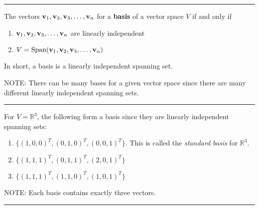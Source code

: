   

\rule[0.01in]{\textwidth}{0.0025in}


\begin{tcolorbox}[colback=yellow!10!,colframe=gray!15!]

\begin{definition}
	The vectors ${\bf v}_1, {\bf v}_2, {\bf v}_3, \dots , {\bf v}_n$ for a \textbf{basis} of a vector space $V$ if and only if
	\begin{enumerate}
		\item ${\bf v}_1, {\bf v}_2, {\bf v}_3, \dots , {\bf v}_n$  are linearly independent
		\item $V = \text{Span}({\bf v}_1, {\bf v}_2, {\bf v}_3, \dots , {\bf v}_n)$ 
	\end{enumerate}
	
	In short, a basis is a linearly independent spanning set.
\end{definition}


\end{tcolorbox}



NOTE: There can be many bases for a given vector space since there are many different linearly independent spanning sets.



\rule[0.01in]{\textwidth}{0.0025in}


\begin{example}
	For $V = \mathbb{R}^3$, the following form a basis since they are linearly independent spanning sets:
	
	\begin{enumerate}
		\item $\{ (1,0, 0)^T, (0, 1, 0)^T, (0, 0, 1)^T \}$.  This is called the \textit{standard basis} for $\mathbb{R}^3$.
		
		\item $\{  (1,1,1)^T, (0, 1, 1)^T, (2, 0, 1)^T  \}$
		
		\item $\{  (1,1,1)^T, (1, 1, 0)^T, (1, 0, 1)^T  \}$
	\end{enumerate}
\end{example}


NOTE:  Each basis contains exactly three vectors.

\rule[0.01in]{\textwidth}{0.0025in}













